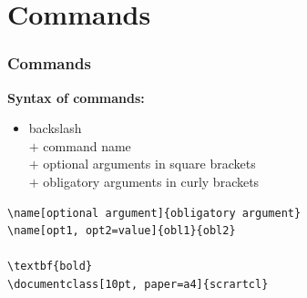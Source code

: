 %
%
%


%
%
%
%
%


\section{Commands}

\begin{frame}[fragile]
\frametitle{Commands}

\textbf{Syntax of commands:}

\begin{itemize}
	
	\item backslash \\
	$+$ command name \\
	$+$ optional arguments in square brackets \\
	$+$ obligatory arguments in curly brackets

\end{itemize}
		
\begin{lstlisting}
\name[optional argument]{obligatory argument} 
\name[opt1, opt2=value]{obl1}{obl2}

\textbf{bold}
\documentclass[10pt, paper=a4]{scrartcl}
\end{lstlisting}

\end{frame}



